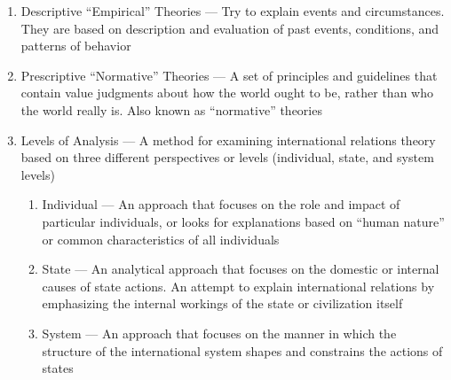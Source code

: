 \documentclass[12pt]{article}
\begin{document}
\begin{enumerate}
      \item Descriptive “Empirical” Theories — Try to explain events and circumstances. They are based on description and evaluation of past events, conditions, and patterns of behavior

      \item Prescriptive “Normative” Theories — A set of principles and guidelines that contain value judgments about how the world ought to be, rather than who the world really is. Also known as “normative” theories

      \item Levels of Analysis — A method for examining international relations theory based on three different perspectives or levels (individual, state, and system levels)

        \begin{enumerate}

          \item Individual — An approach that focuses on the role and impact of particular individuals, or looks for explanations based on “human nature” or common characteristics of all individuals

          \item State — An analytical approach that focuses on the domestic or internal causes of state actions. An attempt to explain international relations by emphasizing the internal workings of the state or civilization itself

          \item System — An approach that focuses on the manner in which the structure of the international system shapes and constrains the actions of states

        \end{enumerate}

    \end{enumerate}
\end{document}
